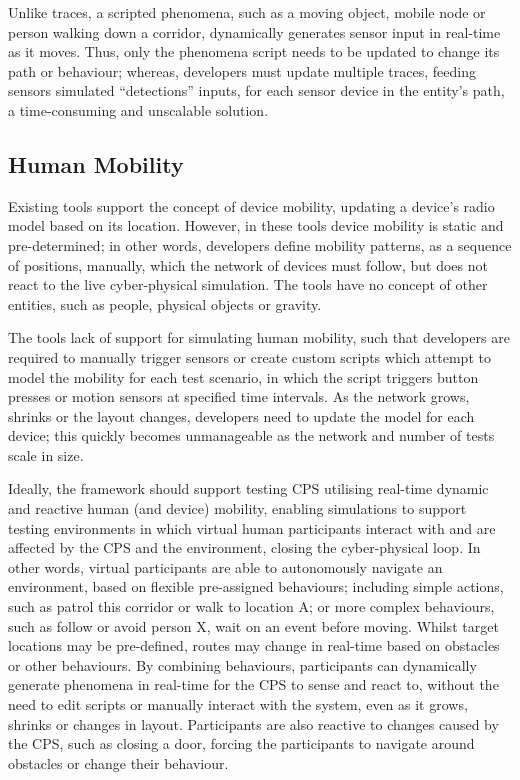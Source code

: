 Unlike traces, a scripted phenomena, such as a moving object, mobile node or person walking down a corridor, dynamically generates sensor input in real-time as it moves. Thus, only the phenomena script needs to be updated to change its path or behaviour; whereas, developers must update multiple traces, feeding sensors simulated ``detections'' inputs, for each sensor device in the entity's path, a time-consuming and unscalable solution.


\subsection{Human Mobility} %
\label{sub:requirements_mobility}
Existing tools support the concept of device mobility, updating a device's radio model based on its location. However, in these tools device mobility is static and pre-determined; in other words, developers define mobility patterns, as a sequence of positions, manually, which the network of devices must follow, but does not react to the live cyber-physical simulation. The tools have no concept of other entities, such as people, physical objects or gravity.

The tools lack of support for simulating human mobility, such that developers are required to manually trigger sensors or create custom scripts which attempt to model the mobility for each test scenario, in which the script triggers button presses or motion sensors at specified time intervals. As the network grows, shrinks or the layout changes, developers need to update the model for each device; this quickly becomes unmanageable as the network and number of tests scale in size.

Ideally, the framework should support testing CPS utilising real-time dynamic and reactive human (and device) mobility, enabling simulations to support testing environments in which virtual human participants interact with and are affected by the CPS and the environment, closing the cyber-physical loop. In other words, virtual participants are able to autonomously navigate an environment, based on flexible pre-assigned behaviours; including simple actions, such as patrol this corridor or walk to location A; or more complex behaviours, such as follow or avoid person X, wait on an event before moving. Whilst target locations may be pre-defined, routes may change in real-time based on obstacles or other behaviours. By combining behaviours, participants can dynamically generate phenomena in real-time for the CPS to sense and react to, without the need to edit scripts or manually interact with the system, even as it grows, shrinks or changes in layout. Participants are also reactive to changes caused by the CPS, such as closing a door, forcing the participants to navigate around obstacles or change their behaviour. 

